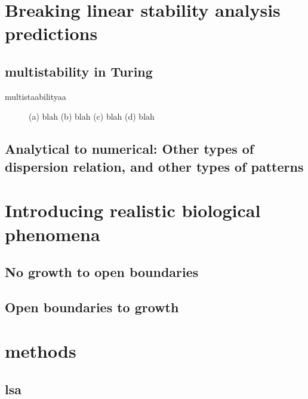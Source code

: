 \section{Breaking linear stability analysis predictions}

\subsection{multistability in Turing}
multistaabilityaa

\begin{adjustbox}{width=1.4\textwidth,center}
\begin{figure}

    \caption{(a) blah (b) blah (c) blah (d) blah}
    \label{fig:foobar}

\end{figure}
\end{adjustbox}


\subsection{Analytical to numerical: Other types of dispersion relation, and other types of patterns}


\section{Introducing realistic biological phenomena}
\subsection{No growth to open boundaries}
\subsection{Open boundaries to growth}


\section{methods}
\subsection{lsa}


